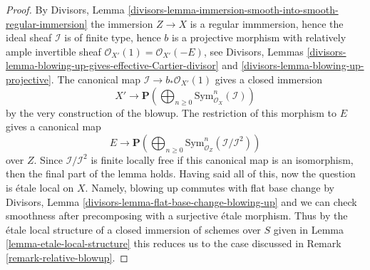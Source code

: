 \documentclass[10pt,a4paper]{amsart}
\theoremstyle{plain}
\theoremstyle{definition}
\theoremstyle{remark}
\numberwithin{equation}{subsection}
\begin{document}
\begin{proof}
By Divisors, Lemma
\ref{divisors-lemma-immersion-smooth-into-smooth-regular-immersion}
the immersion $Z \to X$ is a regular immmersion, hence
the ideal sheaf $\mathcal{I}$ is of finite type, hence $b$ is a projective
morphism with relatively ample invertible sheaf
$\mathcal{O}_{X'}(1) = \mathcal{O}_{X'}(-E)$, see
Divisors, Lemmas
\ref{divisors-lemma-blowing-up-gives-effective-Cartier-divisor} and
\ref{divisors-lemma-blowing-up-projective}.
The canonical map $\mathcal{I} \to b_*\mathcal{O}_{X'}(1)$
gives a closed immersion
$$
X' \longrightarrow
\mathbf{P}\left(\bigoplus\nolimits_{n \geq 0}
\text{Sym}^n_{\mathcal{O}_X}(\mathcal{I})\right)
$$
by the very construction of the blowup. The restriction of this morphism
to $E$ gives a canonical map
$$
E \longrightarrow
\mathbf{P}\left(\bigoplus\nolimits_{n \geq 0}
\text{Sym}^n_{\mathcal{O}_Z}(\mathcal{I}/\mathcal{I}^2)\right)
$$
over $Z$. Since $\mathcal{I}/\mathcal{I}^2$ is finite locally free
if this canonical map is an isomorphism, then the final part of the
lemma holds. Having said all of this, now the question is \'etale
local on $X$. Namely, blowing up commutes with flat base change by
Divisors, Lemma \ref{divisors-lemma-flat-base-change-blowing-up}
and we can check smoothness after precomposing with a surjective
\'etale morphism. Thus by the \'etale local structure of a
closed immersion of schemes over $S$ given in Lemma
\ref{lemma-etale-local-structure} this reduces us to the
case discussed in Remark \ref{remark-relative-blowup}.
\end{proof}
\end{document}
